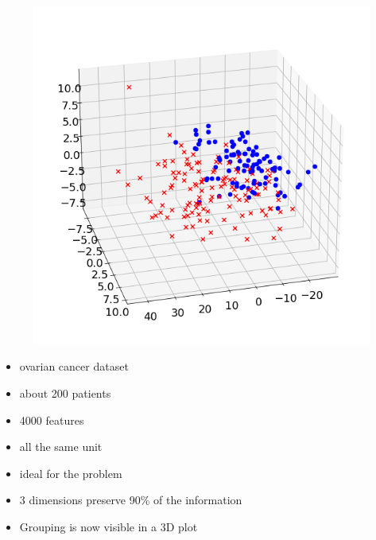 \begin{center}
    \begin{figure}[h]
      \centering
      \includegraphics[width=0.94\linewidth]{external_content/media/ovarian_cancer/visualisation.png}
      \captionsetup{justification=centering}
    \end{figure}
\end{center}

\begin{itemize}
  \item ovarian cancer dataset
  \item about 200 patients
  \item 4000 features
  \item all the same unit
  \item ideal for the problem
  \item 3 dimensions preserve 90\% of the information
  \item Grouping is now visible in a 3D plot
\end{itemize}
